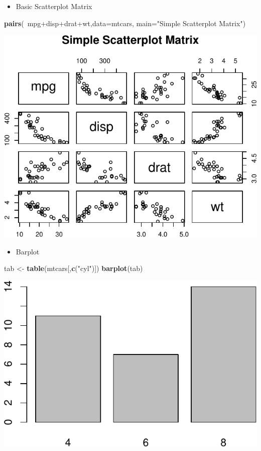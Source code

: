 \documentclass[]{article}
\def\tightlist{}
\newenvironment{Shaded}{\begin{snugshade}}{\end{snugshade}}
\newcommand{\KeywordTok}[1]{\textcolor[rgb]{0.13,0.29,0.53}{\textbf{{#1}}}}
\newcommand{\DataTypeTok}[1]{\textcolor[rgb]{0.13,0.29,0.53}{{#1}}}
\newcommand{\StringTok}[1]{\textcolor[rgb]{0.31,0.60,0.02}{{#1}}}
\newcommand{\NormalTok}[1]{{#1}}
\numberwithin{equation}{section}
\begin{document}
\begin{itemize}
\tightlist
\item
  Basic Scatterplot Matrix
\end{itemize}

\begin{Shaded}
\begin{Highlighting}[]
\KeywordTok{pairs}\NormalTok{(~mpg+disp+drat+wt,}\DataTypeTok{data=}\NormalTok{mtcars,}
   \DataTypeTok{main=}\StringTok{"Simple Scatterplot Matrix"}\NormalTok{)}
\end{Highlighting}
\end{Shaded}

\includegraphics{index_files/figure-latex/unnamed-chunk-61-1.pdf}

\begin{itemize}
\tightlist
\item
  Barplot
\end{itemize}

\begin{Shaded}
\begin{Highlighting}[]
\NormalTok{tab <-}\StringTok{ }\KeywordTok{table}\NormalTok{(mtcars[,}\KeywordTok{c}\NormalTok{(}\StringTok{"cyl"}\NormalTok{)])}
\KeywordTok{barplot}\NormalTok{(tab)}
\end{Highlighting}
\end{Shaded}

\includegraphics{index_files/figure-latex/unnamed-chunk-62-1.pdf}
\end{document}
